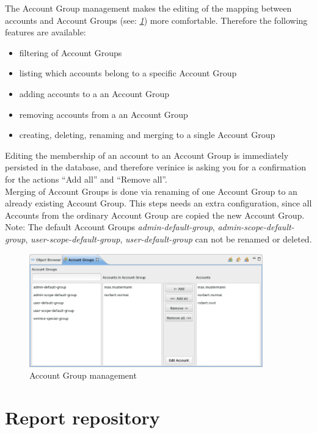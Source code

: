 \documentclass[a4paper,10pt]{book}
\begin{document}
The Account Group management makes the editing of the mapping between
accounts and Account Groups (see:
\textit{\ref{fig:account-groups-management}}) more
comfortable. Therefore the following features are available:

\begin{itemize}
\item filtering of Account Groups
\item listing which accounts belong to a specific Account Group
\item adding accounts to a an Account Group
\item removing accounts from a an Account Group
\item creating, deleting, renaming and merging to a single Account Group
\end{itemize}

Editing the membership of an account to an Account Group is
immediately persisted in the database, and therefore verinice is
asking you for a confirmation for the actions ``Add all'' and ``Remove
all''.\\

Merging of Account Groups is done via renaming of one Account Group to
an already existing Account Group. This steps needs an extra
configuration, since all Accounts from the ordinary Account Group are
copied the new Account Group.\\

Note: The default Account Groups \textit{admin-default-group},
\textit{admin-scope-default-group}, \textit{user-scope-default-group},
\textit{user-default-group} can not be renamed or deleted.

\begin{figure}
  \centering
  \includegraphics[width=0.9\textwidth]{Screenshot/account-groups.png}
  \caption{Account Group management}
\label{fig:account-groups-management}
\end{figure}

\section{Report repository}
\label{sec:report-repository}
\end{document}
